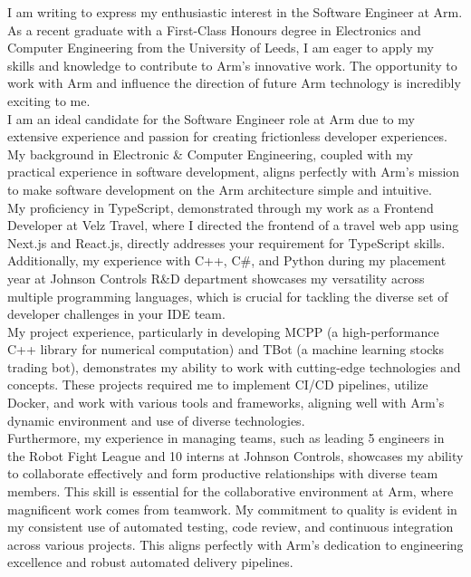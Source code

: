 \documentclass[11pt,a4paper,ragged2e]{altacv}
\begin{document}
\begin{paracol}{1}
\smallskip
{}
I am writing to express my enthusiastic interest in the Software Engineer at Arm. As a recent graduate with a First-Class Honours degree in Electronics and Computer Engineering from the University of Leeds, I am eager to apply my skills and knowledge to contribute to Arm's innovative work. The opportunity to work with Arm and influence the direction of future Arm technology is incredibly exciting to me. \\
I am an ideal candidate for the Software Engineer role at Arm due to my extensive experience and passion for creating frictionless developer experiences. My background in Electronic \& Computer Engineering, coupled with my practical experience in software development, aligns perfectly with Arm's mission to make software development on the Arm architecture simple and intuitive. \\
\medskip
My proficiency in TypeScript, demonstrated through my work as a Frontend Developer at Velz Travel, where I directed the frontend of a travel web app using Next.js and React.js, directly addresses your requirement for TypeScript skills. Additionally, my experience with C++, C\#, and Python during my placement year at Johnson Controls R\&D department showcases my versatility across multiple programming languages, which is crucial for tackling the diverse set of developer challenges in your IDE team. \\
\medskip
My project experience, particularly in developing MCPP (a high-performance C++ library for numerical computation) and TBot (a machine learning stocks trading bot), demonstrates my ability to work with cutting-edge technologies and concepts. These projects required me to implement CI/CD pipelines, utilize Docker, and work with various tools and frameworks, aligning well with Arm's dynamic environment and use of diverse technologies. \\
\medskip
Furthermore, my experience in managing teams, such as leading 5 engineers in the Robot Fight League and 10 interns at Johnson Controls, showcases my ability to collaborate effectively and form productive relationships with diverse team members. This skill is essential for the collaborative environment at Arm, where magnificent work comes from teamwork.
My commitment to quality is evident in my consistent use of automated testing, code review, and continuous integration across various projects. This aligns perfectly with Arm's dedication to engineering excellence and robust automated delivery pipelines. \\

\end{paracol}
\end{document}

